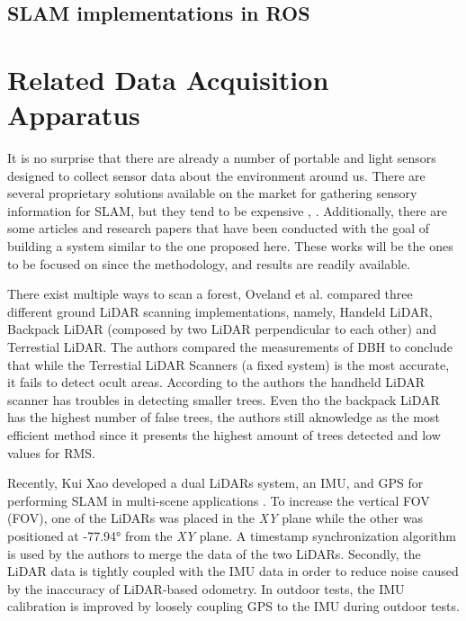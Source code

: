\subsection{\acs*{SLAM} implementations in \acs*{ROS}}



\section{Related Data Acquisition Apparatus}

It is no surprise that there are already a number of portable and light sensors designed to collect sensor data about the environment around us. There are several proprietary solutions available on the market for gathering sensory information for \acs*{SLAM}, but they tend to be expensive \cite{libackpack_C50}, \cite{libackpack_DGC50}. Additionally, there are some articles and research papers that have been conducted with the goal of building a system similar to the one proposed here. These works will be the ones to be focused on since the methodology, and results are readily available.

There exist multiple ways to scan a forest, Oveland et al. \cite{oveland_comparing_2018} compared three different ground LiDAR scanning implementations, namely, Handeld LiDAR, Backpack LiDAR (composed by two \acs*{LiDAR} perpendicular to each other) and Terrestial LiDAR. The authors compared the measurements of \acs*{DBH} to conclude that while the Terrestial LiDAR Scanners (a fixed system) is the most accurate, it fails to detect ocult areas. According to the authors the handheld LiDAR scanner has troubles in detecting smaller trees. Even tho the backpack LiDAR has the highest number of false trees, the authors still aknowledge as the most efficient method since it presents the highest amount of trees detected and low values for \acs*{RMS}.


Recently, Kui Xao developed a dual \acs*{LiDAR}s system, an \acs*{IMU}, and \acs*{GPS} for performing \acs*{SLAM} in multi-scene applications \cite{xiao_high-precision_2022}. To increase the vertical \acl*{FOV} (\acs*{FOV}), one of the \acs*{LiDAR}s was placed in the \textit{XY} plane while the other was positioned at -77.94° from the \textit{XY} plane. A timestamp synchronization algorithm is used by the authors to merge the data of the two \acs*{LiDAR}s. Secondly, the \acs*{LiDAR} data is tightly coupled with the IMU data in order to reduce noise caused by the inaccuracy of \acs*{LiDAR}-based odometry. In outdoor tests, the \acs*{IMU} calibration is improved by loosely coupling \acs*{GPS} to the \acs*{IMU} during outdoor tests.

